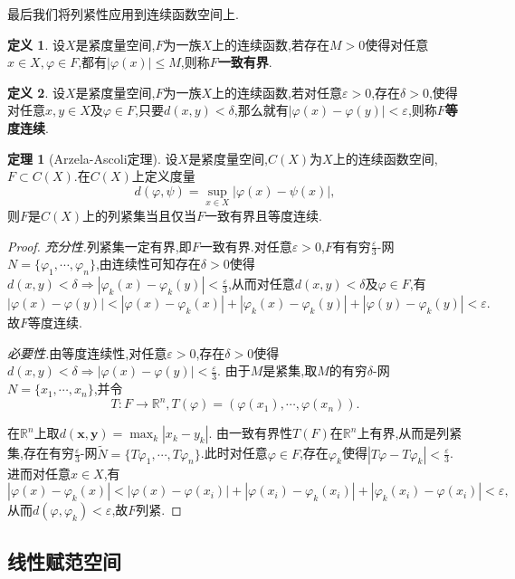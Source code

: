 \documentclass{ctexart}
\theoremstyle{definition}
\newtheorem{definition}{定义}
\newtheorem{theorem}{定理}
\theoremstyle{remark}
\begin{document}
	最后我们将列紧性应用到连续函数空间上.
	\begin{definition}
		设$X$是紧度量空间,$F$为一族$X$上的连续函数,若存在$M>0$使得对任意$x\in X,\varphi\in F$,都有$|\varphi(x)|\le M$,则称$F$\textbf{一致有界}.
	\end{definition}
	\begin{definition}
		设$X$是紧度量空间,$F$为一族$X$上的连续函数,若对任意$\varepsilon>0$,存在$\delta>0$,使得对任意$x,y\in X$及$\varphi\in F$,只要$d(x,y)<\delta$,那么就有$|\varphi(x)-\varphi(y)|<\varepsilon$,则称$F$\textbf{等度连续}.
	\end{definition}
	\begin{theorem}[Arzela-Ascoli定理]
		设$X$是紧度量空间,$C(X)$为$X$上的连续函数空间,$F\subset C(X)$.在$C(X)$上定义度量
		$$d(\varphi,\psi)=\sup_{x\in X}{|\varphi(x)-\psi(x)|},$$
		则$F$是$C(X)$上的列紧集当且仅当$F$一致有界且等度连续.
	\end{theorem}
	\begin{proof}
		\textit{充分性.}列紧集一定有界,即$F$一致有界.对任意$\varepsilon>0$,$F$有有穷$\frac{\varepsilon}{3}$-网$N=\{\varphi_1,\cdots,\varphi_n\}$,由连续性可知存在$\delta>0$使得$d(x,y)<\delta\Rightarrow|\varphi_k(x)-\varphi_k(y)|<\frac{\varepsilon}{3}$,从而对任意$d(x,y)<\delta$及$\varphi\in F$,有
		$$|\varphi(x)-\varphi(y)|<|\varphi(x)-\varphi_k(x)|+|\varphi_k(x)-\varphi_k(y)|+|\varphi(y)-\varphi_k(y)|<\varepsilon.$$
		故$F$等度连续.
		
		\textit{必要性.}由等度连续性,对任意$\varepsilon>0$,存在$\delta>0$使得$d(x,y)<\delta\Rightarrow|\varphi(x)-\varphi(y)|<\frac{\varepsilon}{3}$.
		由于$M$是紧集,取$M$的有穷$\delta$-网$N=\{x_1,\cdots,x_n\}$,并令$$T:F\to\mathbb{R}^n,T(\varphi)=(\varphi(x_1),\cdots,\varphi(x_n)).$$
		
		在$\mathbb{R}^n$上取$d(\mathbf{x},\mathbf{y})=\max_k|x_k-y_k|$.
		由一致有界性$T(F)$在$\mathbb{R}^n$上有界,从而是列紧集,存在有穷$\frac{\varepsilon}{3}$-网$\tilde{N}=\{T\varphi_1,\cdots,T\varphi_n\}$.此时对任意$\varphi\in F$,存在$\varphi_k$使得$|T\varphi-T\varphi_k|<\frac{\varepsilon}{3}$.进而对任意$x\in X$,有
		$$|\varphi(x)-\varphi_k(x)|<|\varphi(x)-\varphi(x_i)|+|\varphi(x_i)-\varphi_k(x_i)|+|\varphi_k(x_i)-\varphi(x_i)|<\varepsilon,$$
		从而$d(\varphi,\varphi_k)<\varepsilon$,故$F$列紧.
	\end{proof}
	
	\subsection{线性赋范空间}
	
\end{document}
